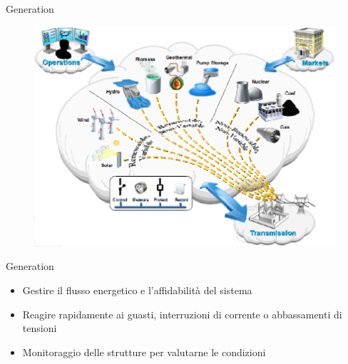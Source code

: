 \begin{frame}[fragile]{Generation}
	\begin{figure}[h] 
		\includegraphics[scale=0.45]{imgs/gen.png}
	\end{figure}
\end{frame}

\begin{frame}[fragile]{Generation}
	\begin{itemize}[<+- | alert@+>]
		\item Gestire il flusso energetico e l'affidabilità del sistema %
		\item Reagire rapidamente ai guasti, interruzioni di corrente o abbassamenti di tensioni %
		\item Monitoraggio delle strutture per valutarne le condizioni
	\end{itemize}
\end{frame}



